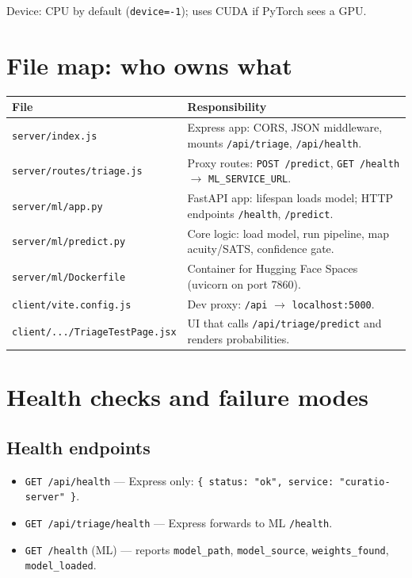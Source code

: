 \documentclass[11pt]{article}
\newcommand{\route}[1]{{\small\texttt{\textcolor{mutel}{#1}}}}
\begin{document}
Device: CPU by default (\texttt{device=-1}); uses CUDA if PyTorch sees a GPU.

\section{File map: who owns what}

\begin{center}
\begin{tabular}{@{}p{}p{}@{}}
\toprule
\textbf{File} & \textbf{Responsibility} \\
\midrule
\route{server/index.js} &
Express app: CORS, JSON middleware, mounts \texttt{/api/triage}, \texttt{/api/health}. \\[4pt]
\route{server/routes/triage.js} &
Proxy routes: \texttt{POST /predict}, \texttt{GET /health} $\to$ \texttt{ML\_SERVICE\_URL}. \\[4pt]
\route{server/ml/app.py} &
FastAPI app: lifespan loads model; HTTP endpoints \texttt{/health}, \texttt{/predict}. \\[4pt]
\route{server/ml/predict.py} &
Core logic: load model, run pipeline, map acuity/SATS, confidence gate. \\[4pt]
\route{server/ml/Dockerfile} &
Container for Hugging Face Spaces (uvicorn on port 7860). \\[4pt]
\route{client/vite.config.js} &
Dev proxy: \texttt{/api} $\to$ \texttt{localhost:5000}. \\[4pt]
\route{client/.../TriageTestPage.jsx} &
UI that calls \texttt{/api/triage/predict} and renders probabilities. \\
\bottomrule
\end{tabular}
\end{center}

\section{Health checks and failure modes}

\subsection{Health endpoints}

\begin{itemize}
  \item \texttt{GET /api/health} --- Express only: \texttt{\{ status: "ok", service: "curatio-server" \}}.
  \item \texttt{GET /api/triage/health} --- Express forwards to ML \texttt{/health}.
  \item \texttt{GET /health} (ML) --- reports \texttt{model\_path}, \texttt{model\_source},
        \texttt{weights\_found}, \texttt{model\_loaded}.
\end{itemize}
\end{document}
